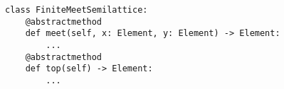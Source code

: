 \par\begin{minipage}{60ex}
\begin{verbatim}
class FiniteMeetSemilattice:
    @abstractmethod
    def meet(self, x: Element, y: Element) -> Element:
        ...
    @abstractmethod
    def top(self) -> Element:
        ...
\end{verbatim}
\end{minipage}\par